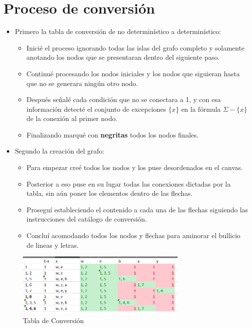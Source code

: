 \documentclass{article}
\begin{document}
	\section{Proceso de conversión}
	\begin{itemize}
	\item Primero la tabla de conversión de no determinístico a determinístico:

		\begin{itemize}
  	  	\item Inicié el proceso ignorando todas las islas del grafo completo y solamente anotando los nodos que se presentaran dentro del siguiente paso.
	
		\item Continué procesando los nodos iniciales y los nodos que siguieran hasta que no se generara ningún otro nodo.

		\item Después señalé cada condición que no se conectara a 1, y con esa información detecté el conjunto de excepciones $\{x\}$ en la fórmula $\Sigma-\{x\}$ de la conexión al primer nodo.
		
		\item Finalizando marqué con \textbf{negritas} todos los nodos finales.
		\end{itemize}
		
	\item Segundo la creación del grafo:

		\begin{itemize}
  	  	\item Para empezar creé todos los nodos y los puse desordenados en el canvas.
  	  	
  	  	\item Posterior a eso puse en su lugar todas las conexiones dictadas por la tabla, sin aún poner los elementos dentro de las flechas.
  	  	
  	  	\item Proseguí estableciendo el contenido a cada una de las flechas siguiendo las instrucciones del catálogo de conversión.
		
  	  	\item Concluí acomodando todos los nodos y flechas para aminorar el bullicio de lineas y letras.  	  	
  	  	\end{itemize}
	
	\end{itemize}
	
	\begin{figure}[h]
    \centering
    \includegraphics[width=0.75\textwidth]{Proceso}
    \caption{Tabla de Conversión}
    \label{fig:proceso}
	\end{figure}
	
\end{document}
